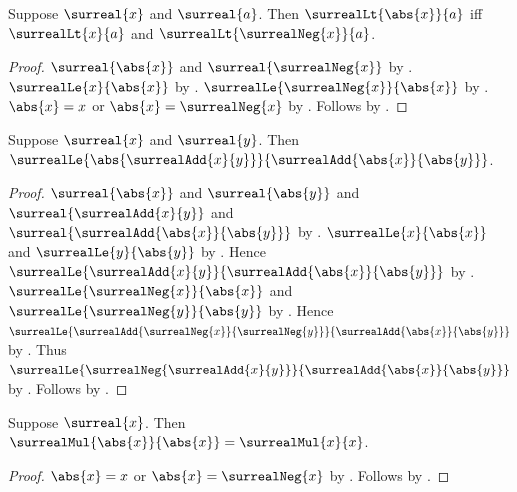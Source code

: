 \begin{theorem}\label{surreal_abs_lt_iff}
    Suppose $\surreal{x}$ and $\surreal{a}$.
    Then $\surrealLt{\abs{x}}{a}$ iff
        $\surrealLt{x}{a}$ and
        $\surrealLt{\surrealNeg{x}}{a}$.
\end{theorem}
\begin{proof}
    $\surreal{\abs{x}}$ and $\surreal{\surrealNeg{x}}$
        by
        .
    $\surrealLe{x}{\abs{x}}$ by .
    $\surrealLe{\surrealNeg{x}}{\abs{x}}$
        by .
    $\abs{x}=x$ or $\abs{x}=\surrealNeg{x}$
        by .
    Follows by .
\end{proof}

\begin{theorem}\label{surreal_abs_triangle}
    Suppose $\surreal{x}$ and $\surreal{y}$.
    Then
        $\surrealLe{\abs{\surrealAdd{x}{y}}}
            {\surrealAdd{\abs{x}}{\abs{y}}}$.
\end{theorem}
\begin{proof}
    $\surreal{\abs{x}}$ and $\surreal{\abs{y}}$ and
        $\surreal{\surrealAdd{x}{y}}$ and
        $\surreal{\surrealAdd{\abs{x}}{\abs{y}}}$
        by .
    $\surrealLe{x}{\abs{x}}$ and
        $\surrealLe{y}{\abs{y}}$
        by .
    Hence
        $\surrealLe{\surrealAdd{x}{y}}
            {\surrealAdd{\abs{x}}{\abs{y}}}$
        by .
    $\surrealLe{\surrealNeg{x}}{\abs{x}}$ and
        $\surrealLe{\surrealNeg{y}}{\abs{y}}$
        by .
    Hence
        $\surrealLe{
            \surrealAdd{\surrealNeg{x}}{\surrealNeg{y}}}
            {\surrealAdd{\abs{x}}{\abs{y}}}$
        by
        .
    Thus
        $\surrealLe{\surrealNeg{\surrealAdd{x}{y}}}
            {\surrealAdd{\abs{x}}{\abs{y}}}$
        by .
    Follows by .
\end{proof}

\begin{proposition}\label{surreal_abs_square}
    Suppose $\surreal{x}$.
    Then
        $\surrealMul{\abs{x}}{\abs{x}}
            =\surrealMul{x}{x}$.
\end{proposition}
\begin{proof}
    $\abs{x}=x$ or $\abs{x}=\surrealNeg{x}$
        by .
    Follows by
        .
\end{proof}


